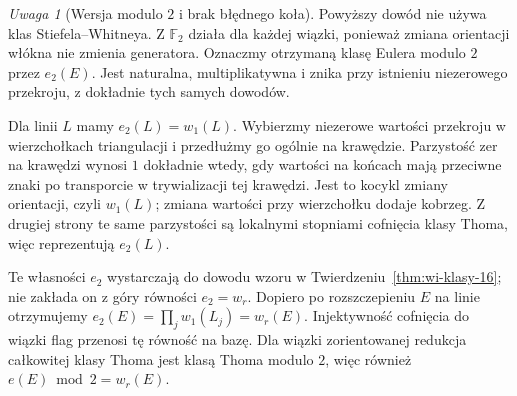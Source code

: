 \documentclass[11pt,a4paper,oneside]{report}
\theoremstyle{plain}
\theoremstyle{definition}
\theoremstyle{remark}
\newtheorem{uwaga}[twierdzenie]{Uwaga}
\begin{document}
\begin{uwaga}[Wersja modulo $2$ i brak błędnego koła]
Powyższy dowód nie używa klas Stiefela--Whitneya.
Z $\mathbb F_2$ działa dla każdej wiązki, ponieważ
zmiana orientacji włókna nie zmienia generatora.
Oznaczmy otrzymaną klasę Eulera modulo $2$ przez $e_2(E)$.
Jest naturalna, multiplikatywna i znika przy istnieniu
niezerowego przekroju, z dokładnie tych samych dowodów.

Dla linii $L$ mamy $e_2(L)=w_1(L)$. Wybierzmy
niezerowe wartości przekroju w wierzchołkach triangulacji
i przedłużmy go ogólnie na krawędzie. Parzystość zer
na krawędzi wynosi $1$ dokładnie wtedy, gdy wartości
na końcach mają przeciwne znaki po transporcie
w trywializacji tej krawędzi. Jest to kocykl zmiany
orientacji, czyli $w_1(L)$; zmiana wartości przy
wierzchołku dodaje kobrzeg. Z drugiej strony te same
parzystości są lokalnymi stopniami cofnięcia klasy Thoma,
więc reprezentują $e_2(L)$.

Te własności $e_2$ wystarczają do dowodu wzoru
w Twierdzeniu~\ref{thm:wi-klasy-16}; nie zakłada on
z góry równości $e_2=w_r$. Dopiero po rozszczepieniu
$E$ na linie otrzymujemy
$e_2(E)=\prod_jw_1(L_j)=w_r(E)$.
Injektywność cofnięcia do wiązki flag przenosi
tę równość na bazę. Dla wiązki zorientowanej
redukcja całkowitej klasy Thoma jest klasą Thoma modulo $2$,
więc również $e(E)\bmod2=w_r(E)$.
\end{uwaga}
\end{document}
